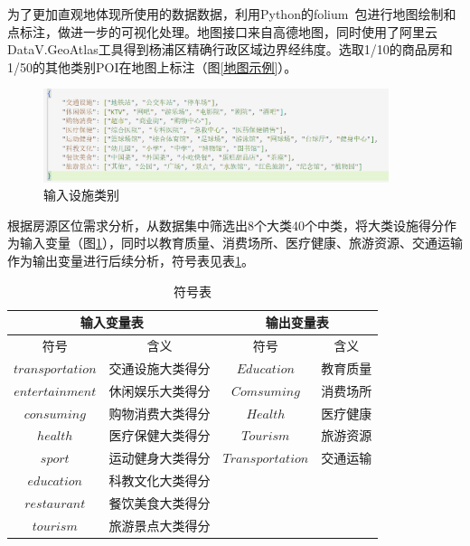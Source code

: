 \documentclass{article}
\begin{document}
为了更加直观地体现所使用的数据数据，利用Python的folium~\cite{folium}包进行地图绘制和点标注，做进一步的可视化处理。地图接口来自高德地图，同时使用了阿里云DataV.GeoAtlas工具得到杨浦区精确行政区域边界经纬度。选取1/10的商品房和1/50的其他类别POI在地图上标注（图\ref{地图示例}）。

\begin{figure}[htbp]
\centering
\includegraphics[width=0.9\textwidth]{./pic/输入设施.png}
\caption{输入设施类别}
\label{输入设施}
\end{figure}

根据房源区位需求分析，从数据集中筛选出8个大类40个中类，将大类设施得分作为输入变量（图\ref{输入设施}），同时以教育质量、消费场所、医疗健康、旅游资源、交通运输作为输出变量进行后续分析，符号表见表\ref{符号表}。

\begin{table}[htbp]
\centering
\begin{tabular}{|c|c|c|c|}
\hline
\multicolumn{2}{|c|}{输入变量表} & \multicolumn{2}{|c|}{输出变量表}\\ \hline
符号             & 含义             & 符号             & 含义\\ \hline
$transportation$ & 交通设施大类得分 & $Education$      & 教育质量 \\ \hline
$entertainment$  & 休闲娱乐大类得分 & $Comsuming$      & 消费场所 \\ \hline
$consuming$      & 购物消费大类得分 & $Health$         & 医疗健康 \\ \hline
$health$         & 医疗保健大类得分 & $Tourism$        & 旅游资源 \\ \hline
$sport$          & 运动健身大类得分 & $Transportation$ & 交通运输 \\ \hline 
$education$      & 科教文化大类得分 & \multicolumn{2}{|c|}{} \\ \hline
$restaurant$     & 餐饮美食大类得分 & \multicolumn{2}{|c|}{} \\ \hline 
$tourism$        & 旅游景点大类得分 & \multicolumn{2}{|c|}{} \\ \hline
\end{tabular}
\caption{符号表}
\label{符号表}
\end{table}
\end{document}
